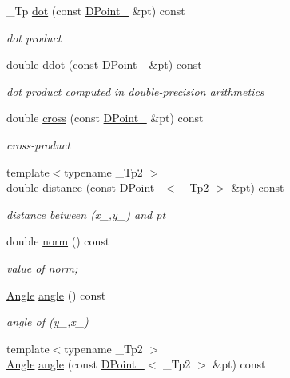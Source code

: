 \begin{DoxyCompactItemize}
\-\_\-\-Tp \hyperlink{classnubot_1_1DPoint___a28e4f820959a63373a76dbd91c7b1420}{dot} (const \hyperlink{classnubot_1_1DPoint__}{D\-Point\-\_\-} \&pt) const 
\begin{DoxyCompactList}\small\item\em dot product \end{DoxyCompactList}\item 
double \hyperlink{classnubot_1_1DPoint___ae98413a5f33675c811d733ed4faefb6a}{ddot} (const \hyperlink{classnubot_1_1DPoint__}{D\-Point\-\_\-} \&pt) const 
\begin{DoxyCompactList}\small\item\em dot product computed in double-\/precision arithmetics \end{DoxyCompactList}\item 
double \hyperlink{classnubot_1_1DPoint___a9d315d9c89bb8068c520fc05f898cca6}{cross} (const \hyperlink{classnubot_1_1DPoint__}{D\-Point\-\_\-} \&pt) const 
\begin{DoxyCompactList}\small\item\em cross-\/product \end{DoxyCompactList}\item 
{\footnotesize template$<$typename \-\_\-\-Tp2 $>$ }\\double \hyperlink{classnubot_1_1DPoint___aaeee628e925a80b8fc2147d14c5ca7e4}{distance} (const \hyperlink{classnubot_1_1DPoint__}{D\-Point\-\_\-}$<$ \-\_\-\-Tp2 $>$ \&pt) const 
\begin{DoxyCompactList}\small\item\em distance between (x\-\_\-,y\-\_\-) and pt \end{DoxyCompactList}\item 
double \hyperlink{classnubot_1_1DPoint___adbeafad257d68a7ec2bba4d11640fa3a}{norm} () const 
\begin{DoxyCompactList}\small\item\em value of norm; \end{DoxyCompactList}\item 
\hyperlink{classnubot_1_1Angle}{Angle} \hyperlink{classnubot_1_1DPoint___a0eb2d9ad77c094e92b7bf4b3cf08eaa2}{angle} () const 
\begin{DoxyCompactList}\small\item\em angle of (y\-\_\-,x\-\_\-) \end{DoxyCompactList}\item 
{\footnotesize template$<$typename \-\_\-\-Tp2 $>$ }\\\hyperlink{classnubot_1_1Angle}{Angle} \hyperlink{classnubot_1_1DPoint___a7c36744c02d0b8876e1b19e412261092}{angle} (const \hyperlink{classnubot_1_1DPoint__}{D\-Point\-\_\-}$<$ \-\_\-\-Tp2 $>$ \&pt) const 

\end{DoxyCompactItemize}
